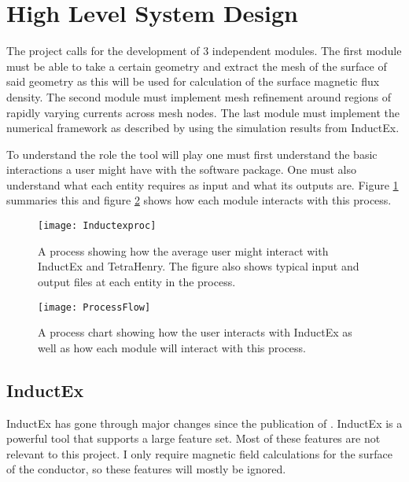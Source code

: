 \section{High Level System Design}
The project calls for the development of 3 independent modules. The first module must be able to take a certain geometry and extract the mesh of the surface of said geometry as this will be used for calculation of the surface magnetic flux density. The second module must implement mesh refinement around regions of rapidly varying currents across mesh nodes. The last module must implement the numerical framework as described by \cite{fluxNoiseSquidsStevenAnton} using the simulation results from InductEx. \par
To understand the role the tool will play one must first understand the basic interactions a user might have with the software package. One must also understand what each entity requires as input and what its outputs are. Figure \ref{fig:Inductexproc} summaries this and figure \ref{fig:ProcessFlow} shows how each module interacts with this process.
\begin{figure}[h]
    \centering
    \texttt{[image: Inductexproc]}
    \caption{A process showing how the average user might interact with InductEx and TetraHenry. The figure also shows typical input and output files at each entity in the process.}
    \label{fig:Inductexproc}
\end{figure}
\begin{figure}[h]
    \centering
    \texttt{[image: ProcessFlow]}
    \caption{A process chart showing how the user interacts with InductEx as well as how each module will interact with this process.}
    \label{fig:ProcessFlow}
\end{figure}

\subsection{InductEx}
InductEx has gone through major changes since the publication of \cite{fluxNoiseSquidsStevenAnton}. InductEx is a powerful tool that supports a large feature set. Most of these features are not relevant to this project. I only require magnetic field calculations for the surface of the conductor, so these features will mostly be ignored.

